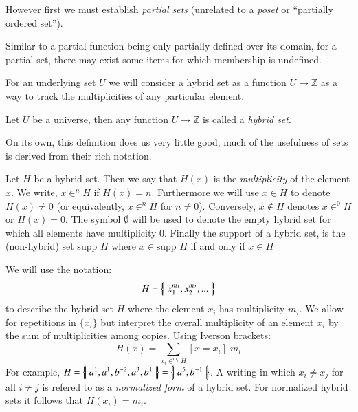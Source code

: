 However first we must establish \emph{partial sets} (unrelated to a \emph{poset} or ``partially ordered set'').

Similar to a partial function being only partially defined over its domain, for a partial set, there may exist some items for which membership is undefined.



For an underlying set $U$ we will consider a hybrid set as a function $U \to \mathbb{Z}$ as a way to track the multiplicities of any particular element.

\begin{definition}
Let $U$ be a universe, then any function $U \to \mathbb{Z}$ is called a \emph{hybrid set}.
\end{definition}

On its own, this definition does us very little good; much of the usefulness of sets is derived from their rich notation.

\begin{definition}
Let $H$ be a hybrid set. Then we say that $H(x)$ is the \emph{multiplicity} of the element $x$. We write, $x \in^n H$ if $H(x)=n$. Furthermore we will use $x \in H$ to denote $H(x)\neq 0$ (or equivalently, $x \in^n H$ for $n\neq 0$).
Conversely, $x \notin H$ denotes $x \in^0 H$ or $H(x)=0$.
The symbol $\emptyset$ will be used to denote the empty hybrid set for which all elements have multiplicity 0.
Finally the support of a hybrid set, is the (non-hybrid) set $\text{supp }H$ where $x \in \text{supp }H$ if and only if $x \in H$
\end{definition}



We will use the notation:
\begin{equation*}
H = \left\{ \! \left| \; x_1^{m_1}, x_2^{m_2},... \; \right| \! \right\}
\end{equation*}
to describe the hybrid set $H$ where the element $x_i$ has multiplicity $m_i$. 
We allow for repetitions in $\{ x_i \}$ but interpret the overall multiplicity of an element $x_i$ by the sum of multiplicities among copies. Using Iverson brackets:
\begin{equation}
H(x) = \sum_{x_i \in^{m_i} H} [x = x_i] \; m_i
\end{equation}
For example, $H=\left\{ \! \left| \; a^1, a^1, b^{-2}, a^3, b^1 \; \right| \! \right\} = \left\{ \! \left| \; a^5, b^{-1} \; \right| \! \right\}$. 
A writing in which $x_i \neq x_j$ for all $i \neq j$ is refered to as a \emph{normalized form} of a hybrid set. 
For normalized hybrid sets it follows that $H(x_i) = m_i$.



